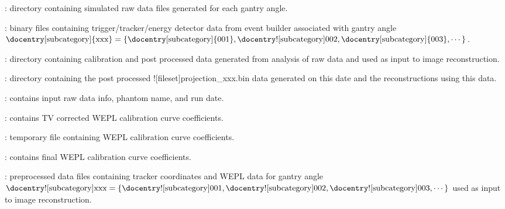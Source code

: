 \begin{tcbenvironment}
\begin{tcbenumbox}
\begin{ThinEnum}
\begin{ThinEnum}
\begin{ThinEnum}
\begin{ThinEnum}
\begin{ThinEnum}
                        \item {} : directory containing simulated raw data files generated for each gantry angle.
                        \begin{ThinEnum}
                            \item {} : binary files containing trigger/tracker/energy detector data from event builder associated with gantry angle $\text{\docentry[subcategory]{xxx}} =\{\text{\docentry[subcategory]{001}}, \text{\docentry![subcategory]{002}}, \text{\docentry[subcategory]{003}}, \cdots\}$.
                        \end{ThinEnum}
                        \item {} : directory containing calibration and post processed data generated from analysis of raw data and used as input to image reconstruction.
                        \begin{ThinEnum}
                            \item {} : directory containing the post processed \docentry![fileset]{projection\_xxx.bin} data generated on this date and the reconstructions using this data.
                            \begin{ThinEnum}
                                \item {} : contains input raw data info, phantom name, and run date.
                                \item {} : contains TV corrected WEPL calibration curve coefficients.
                                \item {} : temporary file containing WEPL calibration curve coefficients.
                                    \item {} : contains final WEPL calibration curve coefficients.
                                \item {} : preprocessed data files containing tracker coordinates and WEPL data for gantry angle $\text{\docentry![subcategory]{xxx}} =\{\text{\docentry![subcategory]{001}}, \text{\docentry![subcategory]{002}}, \text{\docentry![subcategory]{003}}, \cdots\}$ used as input to image reconstruction.

\end{ThinEnum}
\end{ThinEnum}
\end{ThinEnum}
\end{ThinEnum}
\end{ThinEnum}
\end{ThinEnum}
\end{ThinEnum}
\end{tcbenumbox}
\end{tcbenvironment}
